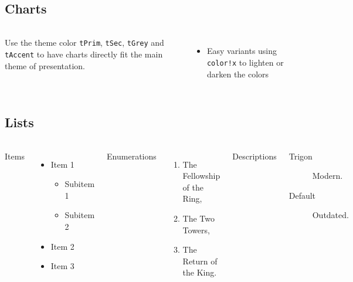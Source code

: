 \subsection{Charts}

\begin{frame}{\insertsectionhead}
  \framesubtitle{\insertsubsectionhead}
  \begin{columns}[c, onlytextwidth]
    Use the theme color \texttt{tPrim}, \texttt{tSec}, \texttt{tGrey} and
    \texttt{tAccent} to have charts directly fit the main theme of presentation.
    \vfill
    \begin{itemize}
      \item Easy variants using \texttt{color!x} to lighten or darken the colors
    \end{itemize}
    \hfill
    \center
  \end{columns}
\end{frame}

\subsection{Lists}

\begin{frame}{\insertsectionhead}
  \framesubtitle{\insertsubsectionhead}
  \begin{columns}[T,onlytextwidth]
    Items
    \begin{itemize}
      \item Item 1
        \begin{itemize}
          \item Subitem 1
          \item Subitem 2
        \end{itemize}
      \item Item 2
      \item Item 3
    \end{itemize}

    Enumerations
    \begin{enumerate}
      \item The Fellowship of the Ring,
      \item The Two Towers,
      \item The Return of the King.
    \end{enumerate}

    Descriptions
    \begin{description}
      \item[Trigon] Modern. \item[Default] Outdated.
    \end{description}
  \end{columns}
\end{frame}

